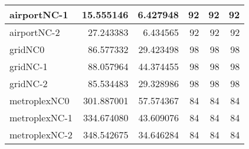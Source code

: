 \begin{longtable}{|l|r|r|r|r|r|}
airportNC-1 & 15.555146 & 6.427948 & 92 & 92 & 92 \\ \hline
airportNC-2 & 27.243383 & 6.434565 & 92 & 92 & 92 \\ \hline
gridNC0 & 86.577332 & 29.423498 & 98 & 98 & 98 \\ \hline
gridNC-1 & 88.057964 & 44.374455 & 98 & 98 & 98 \\ \hline
gridNC-2 & 85.534483 & 29.328986 & 98 & 98 & 98 \\ \hline
metroplexNC0 & 301.887001 & 57.574367 & 84 & 84 & 84 \\ \hline
metroplexNC-1 & 334.674080 & 43.609076 & 84 & 84 & 84 \\ \hline
metroplexNC-2 & 348.542675 & 34.646284 & 84 & 84 & 84 \\ \hline
\end{longtable}
